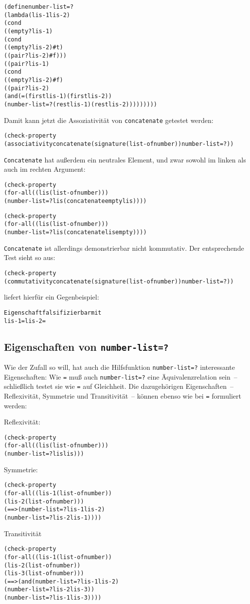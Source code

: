%
\begin{alltt}
(define number-list=?
  (lambda (lis-1 lis-2)
    (cond
      ((empty? lis-1)
       (cond
         ((empty? lis-2) #t)
         ((pair? lis-2) #f)))
      ((pair? lis-1)
       (cond
         ((empty? lis-2) #f)
         ((pair? lis-2)
          (and (= (first lis-1) (first lis-2))
               (number-list=? (rest lis-1) (rest lis-2)))))))))
\end{alltt}
%
Damit kann jetzt die Assoziativität von \texttt{concatenate} getestet werden:
%
\begin{alltt}
(check-property
 (associativity concatenate (signature (list-of number)) number-list=?))
\end{alltt}
%
\texttt{Concatenate} hat außerdem ein neutrales Element, und zwar
sowohl im linken als auch im rechten Argument:
%
\begin{alltt}
(check-property
 (for-all ((lis (list-of number)))
   (number-list=? lis (concatenate empty lis))))

(check-property
 (for-all ((lis (list-of number)))
   (number-list=? lis (concatenate lis empty))))
\end{alltt}
%
\texttt{Concatenate} ist allerdings demonstrierbar nicht kommutativ.
Der entsprechende Test sieht so aus:
%
\begin{alltt}
(check-property
 (commutativity concatenate (signature (list-of number)) number-list=?))
\end{alltt}
%
\drscheme{} liefert hierfür ein Gegenbeispiel:
%
\begin{alltt}
Eigenschaft falsifizierbar mit
         lis-1 =  lis-2 = 
\end{alltt}

\subsection{Eigenschaften von \texttt{number-list=?}}

Wie der Zufall so will, hat auch die Hilfsfunktion
\texttt{number-list=?} interessante Eigenschaften: Wie \texttt{=} muß
auch \texttt{number-list=?} eine Äquivalenzrelation sein~--
schließlich testet sie wie \texttt{=} auf Gleichheit.  Die
dazugehörigen Eigenschaften~-- Reflexivität, Symmetrie und
Transitivität~-- können ebenso wie bei \texttt{=} formuliert werden:

Reflexivität:
%
\begin{alltt}
(check-property
 (for-all ((lis (list-of number)))
   (number-list=? lis lis)))
\end{alltt}
Symmetrie:
\begin{alltt}
(check-property
  (for-all ((lis-1 (list-of number))
            (lis-2 (list-of number)))
    (==> (number-list=? lis-1 lis-2)
         (number-list=? lis-2 lis-1))))
\end{alltt}
 Transitivität
\begin{alltt}
(check-property
 (for-all ((lis-1 (list-of number))
           (lis-2 (list-of number))
           (lis-3 (list-of number)))
   (==> (and (number-list=? lis-1 lis-2)
             (number-list=? lis-2 lis-3))
        (number-list=? lis-1 lis-3))))
\end{alltt}
%

